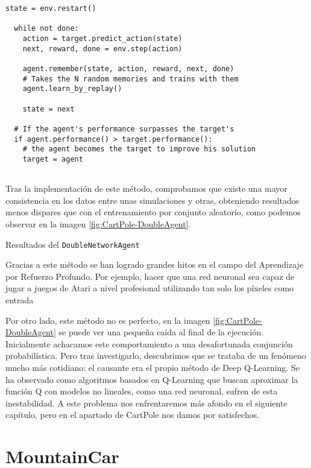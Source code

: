 \begin{minipage}{0.9\linewidth}%
\begin{lstlisting}[frame=tb, caption=Pseudocódigo DoubleAgent, inputencoding=latin1, label=code:cartpole_drl4]
  state = env.restart()

  while not done:
    action = target.predict_action(state)
    next, reward, done = env.step(action)

    agent.remember(state, action, reward, next, done)
    # Takes the N random memories and trains with them
    agent.learn_by_replay()

    state = next

  # If the agent's performance surpasses the target's
  if agent.performance() > target.performance():
    # the agent becomes the target to improve his solution
    target = agent
        
\end{lstlisting}%
\end{minipage}

Tras la implementación de este método, comprobamos que existe una mayor consistencia en los datos entre unas simulaciones y otras, obteniendo resultados menos dispares que con el entrenamiento por conjunto aleatorio, como podemos observar en la imagen \ref{fig:CartPole-DoubleAgent}.

%
       {Resultados del \texttt{DoubleNetworkAgent}}

Gracias a este método se han logrado grandes hitos en el campo del Aprendizaje por Refuerzo Profundo. Por ejemplo, hacer que una red neuronal sea capaz de jugar a juegos de Atari a nivel profesional utilizando tan solo los píxeles como entrada \citep{mnih2013playing}

Por otro lado, este método no es perfecto, en la imagen \ref{fig:CartPole-DoubleAgent} se puede ver una pequeña caída al final de la ejecución. Inicialmente achacamos este comportamiento a una desafortunada conjunción probabilística. Pero tras investigarlo, descubrimos que se trataba de un fenómeno mucho más cotidiano: el causante era el propio método de Deep Q-Learning. Se ha observado como algoritmos basados en Q-Learning que buscan aproximar la función Q con modelos no lineales, como una red neuronal, sufren de esta inestabilidad. A este problema nos enfrentaremos más afondo en el siguiente capítulo, pero en el apartado de CartPole nos damos por satisfechos. 

\section{MountainCar}


